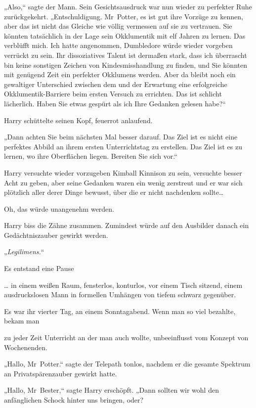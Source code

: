 {„Also,“ sagte der Mann. Sein Gesichtsausdruck war nun wieder zu perfekter Ruhe zurückgekehrt. „Entschuldigung. Mr~Potter, es ist gut ihre Vorzüge zu kennen, aber das ist nicht das Gleiche wie völlig vermessen auf sie zu vertrauen. Sie könnten tatsächlich in der Lage sein Okklumentik mit elf Jahren zu lernen. Das verblüfft mich. Ich hatte angenommen, Dumbledore würde wieder vorgeben verrückt zu sein. Ihr dissoziatives Talent ist dermaßen stark, dass ich überrascht bin keine sonstigen Zeichen von Kindesmisshandlung zu finden, und Sie könnten mit genügend Zeit ein perfekter Okklumens werden. Aber da bleibt noch ein gewaltiger Unterschied zwischen dem und der Erwartung eine erfolgreiche Okklumentik-Barriere beim ersten Versuch zu errichten. Das ist schlicht lächerlich. Haben Sie etwas gespürt als ich Ihre Gedanken gelesen habe?“

Harry schüttelte seinen Kopf, feuerrot anlaufend.

„Dann achten Sie beim nächsten Mal besser darauf. Das Ziel ist es nicht eine perfektes Abbild an ihrem ersten Unterrichtstag zu erstellen. Das Ziel ist es zu lernen, wo ihre Oberflächen liegen. Bereiten Sie sich vor.“

Harry versuchte wieder vorzugeben Kimball Kinnison zu sein, versuchte besser Acht zu geben, aber seine Gedanken waren ein wenig zerstreut und er war sich plötzlich aller derer Dinge bewusst, über die er nicht nachdenken sollte…

Oh, das würde unangenehm werden.

Harry biss die Zähne zusammen. Zumindest würde auf den Ausbilder danach ein Gedächtniszauber gewirkt werden.

„\emph{Legilimens.}“

Es entstand eine Pause \later

… in einem weißen Raum, fensterlos, konturlos, vor einem Tisch sitzend, einem ausdruckslosen Mann in formellen Umhängen von tiefem schwarz gegenüber.

Es war ihr vierter Tag, an einem Sonntagabend. Wenn man so viel bezahlte, bekam man

zu jeder Zeit Unterricht an der man auch wollte, unbeeinflusst vom Konzept von Wochenenden.

„Hallo, Mr~Potter.“ sagte der Telepath tonlos, nachdem er die gesamte Spektrum an Privatspärenzauber gewirkt hatte.

„Hallo, Mr~Bester,“ sagte Harry erschöpft. „Dann sollten wir wohl den anfänglichen Schock hinter uns bringen, oder?

}
